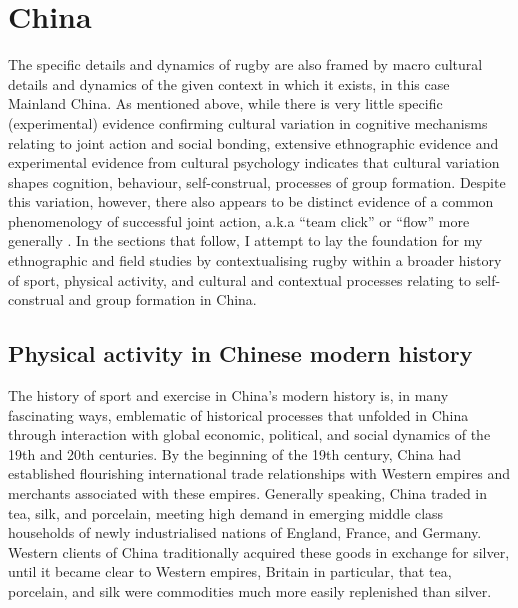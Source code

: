 \section{China}
The specific details and dynamics of rugby are also framed by macro cultural details and dynamics of the given context in which it exists, in this case Mainland China.  As mentioned above, while there is very little specific (experimental) evidence confirming cultural variation in cognitive mechanisms relating to joint action and social bonding, extensive ethnographic evidence and experimental evidence from cultural psychology indicates that cultural variation shapes cognition, behaviour, self-construal, processes of group formation.  Despite this variation, however, there also appears to be distinct evidence of a common phenomenology of successful joint action, a.k.a ``team click'' or ``flow'' more generally \citep{Weed2011,Slingerland2000,Slingerland2014}. In the sections that follow, I attempt to lay the foundation for my ethnographic and field studies by contextualising rugby within a broader history of sport, physical activity, and cultural and contextual processes relating to self-construal and group formation in China.


\subsection{Physical activity in Chinese modern history}
The history of sport and exercise in China's modern history is, in many fascinating ways, emblematic of historical processes that unfolded in China through interaction with global economic, political, and social dynamics of the 19th and 20th centuries.  By the beginning of the 19th century, China had established flourishing international trade relationships with Western empires and merchants associated with these empires.  Generally speaking, China traded in tea, silk, and porcelain, meeting high demand in emerging middle class households of newly industrialised nations of England, France, and Germany.  Western clients of China traditionally acquired these goods in exchange for silver, until it became clear to Western empires, Britain in particular, that tea, porcelain, and silk were commodities much more easily replenished than silver.

